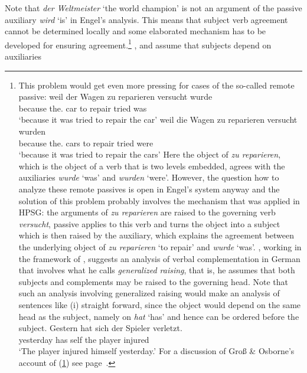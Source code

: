 Note that \emph{der Weltmeister} `the world champion' is not an argument of the passive auxiliary
\emph{wird} `is' in Engel's analysis. This means that subject verb agreement cannot be determined
locally and some elaborated mechanism has to be developed for ensuring agreement.\footnote{%
This problem would get even more pressing for cases of the so-called remote passive:
\eal
\ex
\gll weil der Wagen zu reparieren versucht wurde\\
     because the.\nom{} car to repair tried was\\
\glt `because it was tried to repair the car'
\ex
\gll weil die Wagen zu reparieren versucht wurden\\
     because the.\nom{} cars to repair tried were\\
\glt `because it was tried to repair the cars'
\zl
Here the object of \emph{zu reparieren}, which is the object of a verb that is two levels embedded,
agrees with the auxiliaries \emph{wurde} `was' and \emph{wurden} `were'. However, the question how to analyze these remote
passives is open in Engel's system anyway and the solution of this problem probably involves the mechanism
that was applied in HPSG: the arguments of \emph{zu reparieren} are raised to the governing verb
\emph{versucht}, passive applies to this verb and turns the object into a subject which is then
raised by the auxiliary, which explains the agreement between the underlying object of \emph{zu
  reparieren} `to repair' and \emph{wurde} `was'. \citet{Hudson97a}, working in the framework of \wg, suggests an analysis of verbal
complementation in German that involves what he calls \emph{generalized raising}, that is, he assumes
that both subjects and complements may be raised to the governing head. Note that such an analysis
involving generalized raising would make an analysis of sentences like (i) straight forward, since
the object would depend on the same head as the subject, namely on \emph{hat} `has' and hence can be
ordered before the subject.
\ea
\label{ex-gestern-hat-sich-der-spieler-verletzt}
\gll Gestern hat sich der Spieler verletzt.\\
     yesterday has self the player injured\\
\glt `The player injured himself yesterday.'
\z
For a discussion of Groß \& Osborne's account of (\ref{ex-gestern-hat-sich-der-spieler-verletzt}) see page~\pageref{fig-gestern-hat-sich-der-spieler-verletzt-dg-rising}.
} \citet{Hudson90a-u}, \citet[Section~5.3]{Eroms2000a} and \citet{GO2009a} assume that subjects depend on auxiliaries
